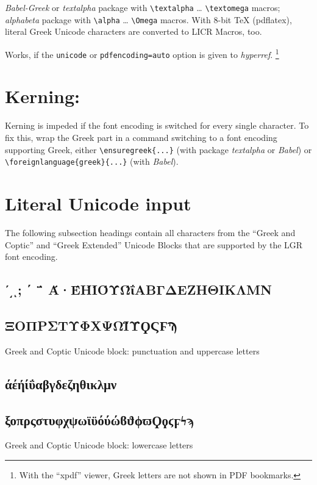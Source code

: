 \documentclass{article}
\newcommand{\cs}[1]{\texttt{\textbackslash #1}}
\begin{document}
\emph{Babel-Greek} or \emph{textalpha} package with \cs{textalpha} …
\cs{textomega} macros; \emph{alphabeta} package with
\cs{alpha} … \cs{Omega} macros.
With 8-bit TeX (pdflatex), literal Greek Unicode characters are
converted to LICR Macros, too.

Works, if the \texttt{unicode} or \texttt{pdfencoding=auto} option is given
to \emph{hyperref}.%
\footnote{With the ``xpdf'' viewer, Greek letters are not shown
	  in PDF bookmarks.}


\section{%
  Kerning: \textAlpha\textUpsilon\textLambda{}
  	   \ensuregreek{\textAlpha\textUpsilon\textLambda}
  	   \foreignlanguage{greek}{\textAlpha\textUpsilon\textLambda}%
}

Kerning is impeded if the font encoding is switched for every single
character. To fix this, wrap the Greek part in a command switching to a font
encoding supporting Greek, either \verb+\ensuregreek{...}+ (with package
\emph{textalpha} or \emph{Babel}) or \verb+\foreignlanguage{greek}{...}+
(with \emph{Babel}).

\section{Literal Unicode input}
The following subsection headings contain all characters from the ``Greek
and Coptic'' and ``Greek Extended'' Unicode Blocks that are supported by the
LGR font encoding.
\subsection{ʹ͵ͺ; ΄ ΅ Ά·ΈΉΊΌΎΏΐΑΒΓΔΕΖΗΘΙΚΛΜΝ}
\subsection{ΞΟΠΡΣΤΥΦΧΨΩΪΫϘϚϜϠ}
Greek and Coptic Unicode block: punctuation and uppercase letters

\subsection{άέήίΰαβγδεζηθικλμν}
\subsection{ξοπρςστυφχψωϊϋόύώϐϑϕϖϘϙϛϝϟϡ}

Greek and Coptic Unicode block: lowercase letters
\end{document}
